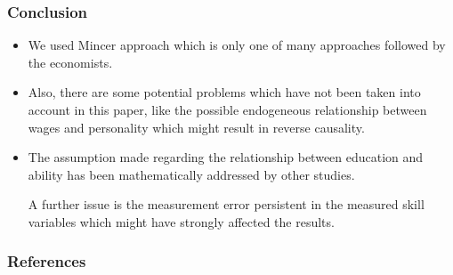 \documentclass[11pt]{beamer}
\begin{document}
\begin{frame}[t]
	\frametitle{Conclusion}
	 \begin{itemize}
	 	\item We used Mincer approach which is only one of many approaches
followed by the economists.

		\item Also, there are some potential problems which have not been taken
into account in this paper, like the possible endogeneous relationship
between wages and personality which might result in reverse
causality.

		\item The assumption made regarding the relationship between education
and ability has been mathematically addressed by other studies.

A further issue is the measurement error persistent in the measured
skill variables which might have strongly affected the results.
	\end{itemize}
\end{frame}



 {
    \begin{frame}
        \frametitle{}
    \end{frame}

}

\begin{frame}[allowframebreaks]
    \frametitle{References}
    
    \renewcommand{\bibfont}{\normalfont\footnotesize}
    \printbibliography
    
    
\end{frame}
\end{document}
